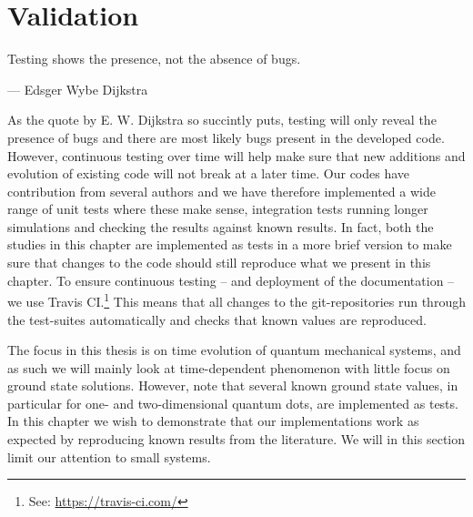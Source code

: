 \chapter{Validation}
    \label{chap:validation}
    \epigraph{Testing shows the presence, not the absence of bugs.}
    {--- Edsger Wybe Dijkstra}

    As the quote by E. W. Dijkstra so succintly puts, testing will only reveal
    the presence of bugs and there are most likely bugs present in the developed
    code.
    However, continuous testing over time will help make sure that new additions
    and evolution of existing code will not break at a later time.
    Our codes have contribution from several authors and we have therefore
    implemented a wide range of unit tests where these make sense, integration
    tests running longer simulations and checking the results against known
    results.
    In fact, both the studies in this chapter are implemented as tests in a more
    brief version to make sure that changes to the code should still reproduce
    what we present in this chapter.
    To ensure continuous testing -- and deployment of the documentation --
    we use Travis CI.\footnote{%
        See: \url{https://travis-ci.com/}
    }
    This means that all changes to the git-repositories run through the
    test-suites automatically and checks that known values are reproduced.

    The focus in this thesis is on time evolution of quantum mechanical systems,
    and as such we will mainly look at time-dependent phenomenon with little
    focus on ground state solutions.
    However, note that several known ground state values, in particular for one-
    and two-dimensional quantum dots, are implemented as tests.
    In this chapter we wish to demonstrate that our implementations work as
    expected by reproducing known results from the literature.
    We will in this section limit our attention to small systems.

